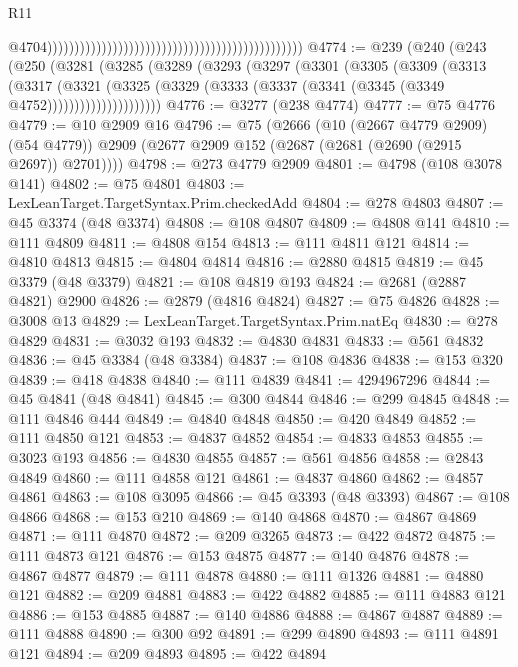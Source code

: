 \begin{lexlean}{R11}
\begin{coremodule}
                                                                                                  @4704)))))))))))))))))))))))))))))))))))))))))))))))
@4774 := @239
    (@240
      (@243
        (@250
          (@3281
            (@3285
              (@3289
                (@3293
                  (@3297
                    (@3301
                      (@3305
                        (@3309
                          (@3313
                            (@3317
                              (@3321
                                (@3325
                                  (@3329
                                    (@3333 (@3337 (@3341 (@3345 (@3349 @4752)))))))))))))))))))))
@4776 := @3277 (@238 @4774)
@4777 := @75 @4776
@4779 := @10 @2909 @16
@4796 := @75
    (@2666
      (@10 (@2667 @4779 @2909) (@54 @4779))
      @2909
      (@2677 @2909 @152 (@2687 (@2681 (@2690 (@2915 @2697)) @2701))))
@4798 := @273 @4779 @2909
@4801 := @4798 (@108 @3078 @141)
@4802 := @75 @4801
@4803 := LexLeanTarget.TargetSyntax.Prim.checkedAdd
@4804 := @278 @4803
@4807 := @45 @3374 (@48 @3374)
@4808 := @108 @4807
@4809 := @4808 @141
@4810 := @111 @4809
@4811 := @4808 @154
@4813 := @111 @4811 @121
@4814 := @4810 @4813
@4815 := @4804 @4814
@4816 := @2880 @4815
@4819 := @45 @3379 (@48 @3379)
@4821 := @108 @4819 @193
@4824 := @2681 (@2887 @4821) @2900
@4826 := @2879 (@4816 @4824)
@4827 := @75 @4826
@4828 := @3008 @13
@4829 := LexLeanTarget.TargetSyntax.Prim.natEq
@4830 := @278 @4829
@4831 := @3032 @193
@4832 := @4830 @4831
@4833 := @561 @4832
@4836 := @45 @3384 (@48 @3384)
@4837 := @108 @4836
@4838 := @153 @320
@4839 := @418 @4838
@4840 := @111 @4839
@4841 := 4294967296
@4844 := @45 @4841 (@48 @4841)
@4845 := @300 @4844
@4846 := @299 @4845
@4848 := @111 @4846 @444
@4849 := @4840 @4848
@4850 := @420 @4849
@4852 := @111 @4850 @121
@4853 := @4837 @4852
@4854 := @4833 @4853
@4855 := @3023 @193
@4856 := @4830 @4855
@4857 := @561 @4856
@4858 := @2843 @4849
@4860 := @111 @4858 @121
@4861 := @4837 @4860
@4862 := @4857 @4861
@4863 := @108 @3095
@4866 := @45 @3393 (@48 @3393)
@4867 := @108 @4866
@4868 := @153 @210
@4869 := @140 @4868
@4870 := @4867 @4869
@4871 := @111 @4870
@4872 := @209 @3265
@4873 := @422 @4872
@4875 := @111 @4873 @121
@4876 := @153 @4875
@4877 := @140 @4876
@4878 := @4867 @4877
@4879 := @111 @4878
@4880 := @111 @1326
@4881 := @4880 @121
@4882 := @209 @4881
@4883 := @422 @4882
@4885 := @111 @4883 @121
@4886 := @153 @4885
@4887 := @140 @4886
@4888 := @4867 @4887
@4889 := @111 @4888
@4890 := @300 @92
@4891 := @299 @4890
@4893 := @111 @4891 @121
@4894 := @209 @4893
@4895 := @422 @4894

\end{coremodule}
\end{lexlean}

